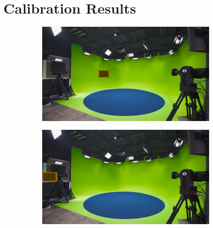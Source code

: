\section{Calibration Results}

\begin{figure}[h]
    \centering
    \begin{subfigure}[b]{0.45\textwidth}
        \includegraphics[width=\textwidth]{Images/08annex/results/1.2.png}
        \caption{}
        \label{fig:a2}
    \end{subfigure}
    \hfill
    \begin{subfigure}[b]{0.45\textwidth}
        \includegraphics[width=\textwidth]{Images/08annex/results/1.3.png}
        \caption{}
        \label{fig:b2}
    \end{subfigure}
    
    \vspace{0.5cm}
    

\end{figure}
